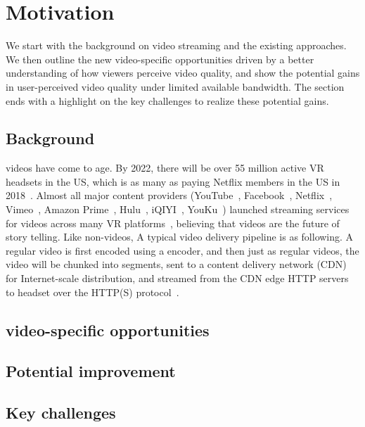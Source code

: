 
\section{Motivation}

We start with the background on \vr video streaming and the existing approaches.
We then outline the new \vr video-specific opportunities driven by a better understanding of how viewers perceive \vr video quality, and show the potential gains in user-perceived \vr video quality under limited available bandwidth. 
The section ends with a highlight on the key challenges to realize these potential gains.


\subsection{Background}

\vr videos have come to age.
By 2022, there will be over 55 million active VR headsets in the US, which is as many as paying Netflix members in the US in 2018~\cite{https://qz.com/1298512/vr-could-be-as-big-in-the-us-as-netflix-in-five-years-study-shows/}.
Almost all major content providers (YouTube~\cite{??}, Facebook~\cite{??}, Netflix~\cite{??}, Vimeo~\cite{??}, Amazon Prime~\cite{??}, Hulu~\cite{??}, iQIYI~\cite{??}, YouKu~\cite{??}) launched streaming services for \vr videos across many VR platforms~\cite{oculus,samsung,daydreams,etc}, believing that \vr videos are the future of story telling. 
Like non-\vr videos, 
A typical \vr video delivery pipeline is as following. 
A regular video is first encoded using a \vr encoder, and then just as regular videos, the \vr video will be chunked into segments, sent to a content delivery network (CDN) for Internet-scale distribution, and streamed from the CDN edge HTTP servers to \vr headset over the HTTP(S) protocol~\cite{hls,https://www.wowza.com/solutions/streaming-types/virtual-reality-and-360-degree-streaming}.





\subsection{\vr video-specific opportunities}


\subsection{Potential improvement}


\subsection{Key challenges}




